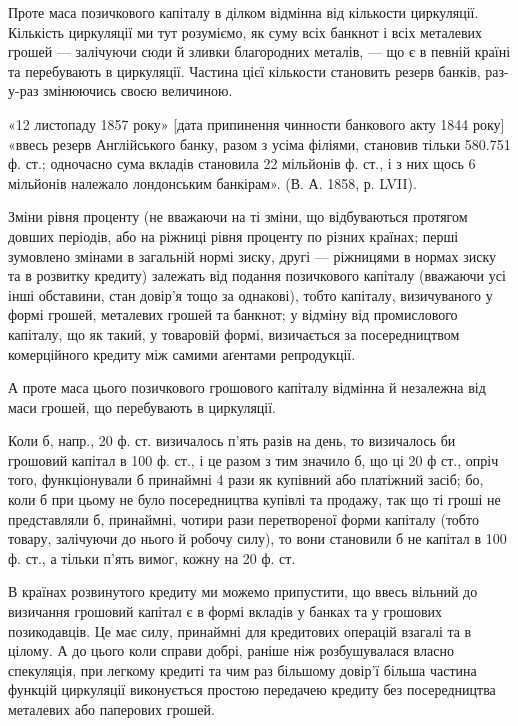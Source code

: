 
Проте маса позичкового капіталу в ділком відмінна від кількости циркуляції.
Кількість циркуляції ми тут розуміємо, як суму всіх банкнот і всіх металевих
грошей — залічуючи сюди й зливки благородних металів, — що є в певній
країні та перебувають в циркуляції. Частина цієї кількости становить резерв
банків, раз-у-раз змінюючись своєю величиною.

«12 листопаду 1857 року» [дата припинення чинности банкового акту
1844 року] «ввесь резерв Англійського банку, разом з усіма філіями, становив
тільки 580.751 ф. ст.; одночасно сума вкладів становила 22 мільйонів ф. ст.,
і з них щось 6 мільйонів належало лондонським банкірам». (В. А. 1858, р. LVII).

Зміни рівня проценту (не вважаючи на ті зміни, що відбуваються протягом
довших періодів, або на ріжниці рівня проценту по різних країнах; перші
зумовлено змінами в загальній нормі зиску, другі — ріжницями в нормах зиску
та в розвитку кредиту) залежать від подання позичкового капіталу (вважаючи
усі інші обставини, стан довір’я тощо за однакові), тобто капіталу, визичуваного
у формі грошей, металевих грошей та банкнот; у відміну від промислового
капіталу, що як такий, у товаровій формі, визичається за посередництвом
комерційного кредиту між самими аґентами репродукції.

А проте маса цього позичкового грошового капіталу відмінна й незалежна
від маси грошей, що перебувають в циркуляції.

Коли б, напр., 20 ф. ст. визичалось п’ять разів на день, то визичалось би
грошовий капітал в 100 ф. ст., і це разом з тим значило б, що ці 20 ф ст.,
опріч того, функціонували б принаймні 4 рази як купівний або платіжний
засіб; бо, коли б при цьому не було посередництва купівлі та продажу, так
що ті гроші не представляли б, принаймні, чотири рази перетвореної форми
капіталу (тобто товару, залічуючи до нього й робочу силу), то вони становили б
не капітал в 100 ф. ст., а тільки п’ять вимог, кожну на 20 ф. ст.

В країнах розвинутого кредиту ми можемо припустити, що ввесь вільний до
визичання грошовий капітал є в формі вкладів у банках та у грошових позикодавців.
Це має силу, принаймні для кредитових операцій взагалі та в цілому. А до цього
коли справи добрі, раніше ніж розбушувалася власно спекуляція, при легкому кредиті
та чим раз більшому довір’ї більша частина функцій циркуляції виконується
простою передачею кредиту без посередництва металевих або паперових грошей.


